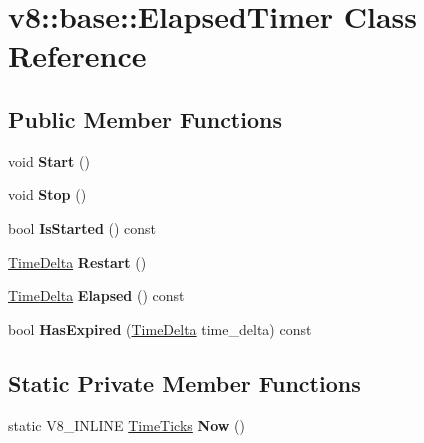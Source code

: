 \hypertarget{classv8_1_1base_1_1_elapsed_timer}{}\section{v8\+:\+:base\+:\+:Elapsed\+Timer Class Reference}
\label{classv8_1_1base_1_1_elapsed_timer}
\subsection*{Public Member Functions}
\begin{DoxyCompactItemize}
\item 
void {\bfseries Start} ()\hypertarget{classv8_1_1base_1_1_elapsed_timer_a451f6e2636acacce40e1dad13fbf7a20}{}\label{classv8_1_1base_1_1_elapsed_timer_a451f6e2636acacce40e1dad13fbf7a20}

\item 
void {\bfseries Stop} ()\hypertarget{classv8_1_1base_1_1_elapsed_timer_ae6991b8f7a97d66db8a05fc4b36b6c98}{}\label{classv8_1_1base_1_1_elapsed_timer_ae6991b8f7a97d66db8a05fc4b36b6c98}

\item 
bool {\bfseries Is\+Started} () const \hypertarget{classv8_1_1base_1_1_elapsed_timer_acb784a96719047530bc5bc92f9f00586}{}\label{classv8_1_1base_1_1_elapsed_timer_acb784a96719047530bc5bc92f9f00586}

\item 
\hyperlink{classv8_1_1base_1_1_time_delta}{Time\+Delta} {\bfseries Restart} ()\hypertarget{classv8_1_1base_1_1_elapsed_timer_a99ca2e2048926dab4730808c8c11c48b}{}\label{classv8_1_1base_1_1_elapsed_timer_a99ca2e2048926dab4730808c8c11c48b}

\item 
\hyperlink{classv8_1_1base_1_1_time_delta}{Time\+Delta} {\bfseries Elapsed} () const \hypertarget{classv8_1_1base_1_1_elapsed_timer_ab7496e0e189310e9427613ff48ac2f42}{}\label{classv8_1_1base_1_1_elapsed_timer_ab7496e0e189310e9427613ff48ac2f42}

\item 
bool {\bfseries Has\+Expired} (\hyperlink{classv8_1_1base_1_1_time_delta}{Time\+Delta} time\+\_\+delta) const \hypertarget{classv8_1_1base_1_1_elapsed_timer_acdb157f63c60d49577f7f1e209ff710c}{}\label{classv8_1_1base_1_1_elapsed_timer_acdb157f63c60d49577f7f1e209ff710c}

\end{DoxyCompactItemize}
\subsection*{Static Private Member Functions}
\begin{DoxyCompactItemize}
\item 
static V8\+\_\+\+I\+N\+L\+I\+NE \hyperlink{classv8_1_1base_1_1_time_ticks}{Time\+Ticks} {\bfseries Now} ()\hypertarget{classv8_1_1base_1_1_elapsed_timer_ad424039974da88082506c4538f665ddc}{}\label{classv8_1_1base_1_1_elapsed_timer_ad424039974da88082506c4538f665ddc}

\end{DoxyCompactItemize}
